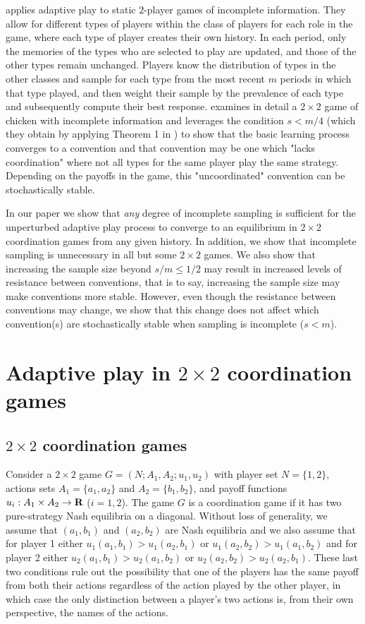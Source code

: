 \cite{jensen2005evolution} applies adaptive play to static $2$-player games of incomplete information. They allow for different types of players within the class of players for each role in the game, where  each type of player creates their own history. In each period, only the memories of the types who are selected to play are updated, and those of the other types remain unchanged. Players know the distribution of types in the other classes and sample for each type from the most recent $m$ periods in which that type played, and then weight their sample by the prevalence of each type and subsequently compute their best response. 
\cite{jensen2005evolution} examines in detail a $2\times 2$ game of chicken with incomplete information and leverages the condition $s<m/4$ (which they obtain by applying Theorem 1 in  \cite{young1993evolution})
to show that the basic learning process converges to a convention and that convention may be one which "lacks coordination" where not all types for the same player play the same strategy. Depending on the payoffs in the game, this "uncoordinated" convention can be stochastically stable. 

In our paper we show that \textit{any} degree of incomplete sampling is sufficient for the unperturbed adaptive play process to converge to an equilibrium in $2\times 2$ coordination games from any given history. In addition, we show that incomplete sampling is unnecessary in all but some $2 \times 2$ games. We also show that increasing the sample size beyond $s/m \leq 1/2$ may result in increased levels of resistance between conventions, that is to say, increasing the sample size may make conventions more stable. However, even though the resistance between conventions may change, we show that this change does not affect which convention(s) are stochastically stable when sampling is incomplete ($s<m$).

\section{Adaptive play in $2\times 2$ coordination games}

\subsection{$2\times 2$ coordination games}

Consider a $2\times 2$ game $G=(N;A_1,A_2;u_1, u_2)$ with player set $N=\{1,2\}$, actions sets $A_1=\{a_1,a_2\}$ and $A_2=\{b_1,b_2\}$, and payoff functions $u_i: A_1\times A_2 \rightarrow \bf{R}$ ($i=1,2$). The game $G$ is a coordination game if it has two pure-strategy Nash equilibria on a diagonal. Without loss of generality, we assume that $(a_1,b_1)$ and $(a_2,b_2)$ are Nash equilibria and we also assume that for player 1 either $u_1(a_1,b_1) > u_1(a_2,b_1)$ or $u_1(a_2,b_2) > u_1(a_1,b_2)$ and for player 2 either $u_2(a_1,b_1) > u_2(a_1,b_2)$ or $u_2(a_2,b_2) > u_2(a_2,b_1)$. These last two conditions rule out the possibility that one of the players has the same payoff from both their actions regardless of the action played by the other player, in which case the only distinction between a player's two actions is, from their own perspective, the names of the actions.

